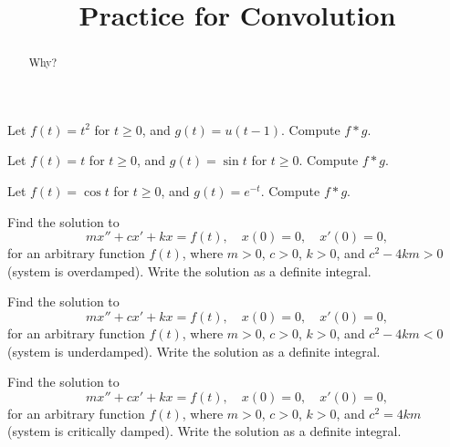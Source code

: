 \documentclass{ximera}
\title{Practice for Convolution}
\begin{document}
\begin{abstract}
Why?
\end{abstract}
\maketitle


\begin{exercise}
    Let $f(t) = t^2$ for $t \geq 0$, and $g(t) = u(t-1)$.  Compute $f * g$.
\end{exercise}

\begin{exercise}
    Let $f(t) = t$ for $t \geq 0$, and $g(t) = \sin t $ for $t \geq 0$.  Compute $f * g$.
\end{exercise}

\begin{exercise}%
    Let $f(t) = \cos t$ for $t \geq 0$, and $g(t) = e^{-t}$.  Compute $f * g$.
\end{exercise}

\begin{exercise}
    Find the solution to
    \begin{equation*}
        m x'' + c x' + k x = f(t) , \quad x(0) = 0, \quad x'(0) = 0 ,
    \end{equation*}
    for an arbitrary function $f(t)$, where $m > 0$, $c > 0$, $k > 0$, and $c^2 - 4km > 0$ (system is overdamped). Write the solution as a definite integral.
\end{exercise}

\begin{exercise}
    Find the solution to
    \begin{equation*}
        m x'' + c x' + k x = f(t) , \quad x(0) = 0, \quad x'(0) = 0 ,
    \end{equation*}
    for an arbitrary function $f(t)$, where $m > 0$, $c > 0$, $k > 0$, and $c^2 - 4km < 0$ (system is underdamped). Write the solution as a definite integral.
\end{exercise}

\begin{exercise}
    Find the solution to
    \begin{equation*}
        m x'' + c x' + k x = f(t) , \quad x(0) = 0, \quad x'(0) = 0 ,
    \end{equation*}
    for an arbitrary function $f(t)$, where $m > 0$, $c > 0$, $k > 0$, and $c^2 = 4km$ (system is critically damped). Write the solution as a definite integral.
\end{exercise}
\end{document}
